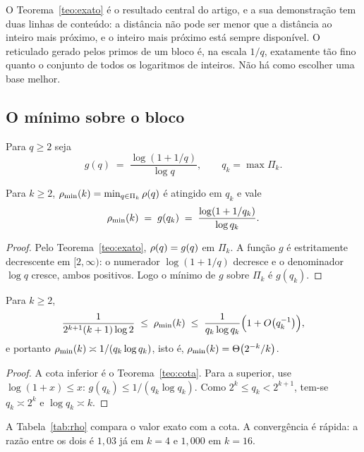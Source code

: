 O Teorema~\ref{teo:exato} é o resultado central do artigo, e a sua demonstração
tem duas linhas de conteúdo: a distância não pode ser menor que a distância ao
inteiro mais próximo, e o inteiro mais próximo está sempre disponível. O
reticulado gerado pelos primos de um bloco é, na escala $1/q$, exatamente tão fino
quanto o conjunto de todos os logaritmos de inteiros. Não há como escolher uma
base melhor.

\subsection{O mínimo sobre o bloco}

\begin{definicao}\label{def:g}
Para $q\ge2$ seja
\[
  g(q) \;=\; \frac{\log(1+1/q)}{\log q}, \qquad q_k=\max\Pi_k .
\]
\end{definicao}

\begin{corolario}\label{cor:min}
Para $k\ge2$, $\rho_{\min}(k)=\min_{q\in\Pi_k}\rho(q)$ é atingido em $q_k$ e vale
\[
  \rho_{\min}(k) \;=\; g(q_k) \;=\; \frac{\log(1+1/q_k)}{\log q_k}.
\]
\end{corolario}

\begin{proof}
Pelo Teorema~\ref{teo:exato}, $\rho(q)=g(q)$ em $\Pi_k$. A função $g$ é estritamente
decrescente em $[2,\infty)$: o numerador $\log(1+1/q)$ decresce e o denominador
$\log q$ cresce, ambos positivos. Logo o mínimo de $g$ sobre $\Pi_k$ é $g(q_k)$.
\end{proof}

\begin{corolario}\label{cor:assint}
Para $k\ge2$,
\[
  \frac{1}{2^{k+1}(k+1)\log 2} \;\le\; \rho_{\min}(k) \;\le\;
  \frac{1}{q_k\log q_k}\Bigl(1+O\bigl(q_k^{-1}\bigr)\Bigr),
\]
e portanto $\rho_{\min}(k)\asymp 1/(q_k\log q_k)$, isto é,
$\rho_{\min}(k)=\Theta\bigl(2^{-k}/k\bigr)$.
\end{corolario}

\begin{proof}
A cota inferior é o Teorema~\ref{teo:cota}. Para a superior, use
$\log(1+x)\le x$: $g(q_k)\le 1/(q_k\log q_k)$. Como
$2^k\le q_k<2^{k+1}$, tem-se $q_k\asymp 2^k$ e $\log q_k\asymp k$.
\end{proof}

A Tabela~\ref{tab:rho} compara o valor exato com a cota. A convergência é rápida:
a razão entre os dois é $1{,}03$ já em $k=4$ e $1{,}000$ em $k=16$.

